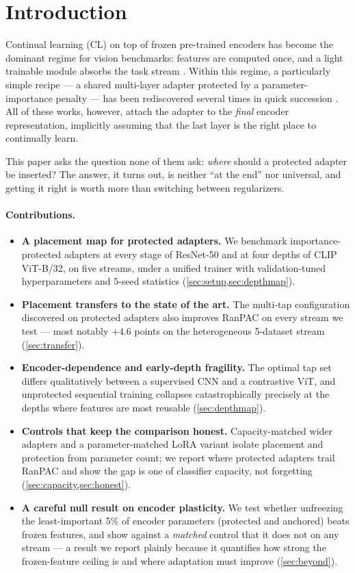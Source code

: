\documentclass{article} %
\begin{document}
\section{Introduction}
Continual learning (CL) on top of frozen pre-trained encoders has become the
dominant regime for vision benchmarks: features are computed once, and a light
trainable module absorbs the task stream
\citep{zhou2023revisiting,mcdonnell2023ranpac,wang2022l2p}. Within this regime,
a particularly simple recipe --- a shared multi-layer adapter protected by a
parameter-importance penalty \citep{kirkpatrick2017ewc,aljundi2018mas} --- has
been rediscovered several times in quick succession
\citep{ewclora2026,onlinelora2025}. All of these works, however,
attach the adapter to the \emph{final} encoder representation, implicitly
assuming that the last layer is the right place to continually learn.

This paper asks the question none of them ask: \emph{where} should a protected
adapter be inserted? The answer, it turns out, is neither ``at the end'' nor
universal, and getting it right is worth more than switching between
regularizers.

\paragraph{Contributions.}
\begin{itemize}
\item \textbf{A placement map for protected adapters.} We benchmark
  importance-protected adapters at every stage of ResNet-50 and at four depths
  of CLIP ViT-B/32, on five streams, under a unified trainer with
  validation-tuned hyperparameters and 5-seed statistics
  (\cref{sec:setup,sec:depthmap}).
\item \textbf{Placement transfers to the state of the art.} The multi-tap
  configuration discovered on protected adapters also improves RanPAC
  \citep{mcdonnell2023ranpac} on every stream we test --- most notably
  $+4.6$ points on the heterogeneous 5-dataset stream (\cref{sec:transfer}).
\item \textbf{Encoder-dependence and early-depth fragility.} The optimal tap
  set differs qualitatively between a supervised CNN and a contrastive ViT,
  and unprotected sequential training collapses catastrophically precisely at
  the depths where features are most reusable (\cref{sec:depthmap}).
\item \textbf{Controls that keep the comparison honest.} Capacity-matched
  wider adapters and a parameter-matched LoRA variant isolate placement and
  protection from parameter count; we report where protected adapters trail
  RanPAC and show the gap is one of classifier capacity, not forgetting
  (\cref{sec:capacity,sec:honest}).
\item \textbf{A careful null result on encoder plasticity.} We test whether
  unfreezing the least-important 5\% of encoder parameters (protected and
  anchored) beats frozen features, and show against a \emph{matched} control
  that it does not on any stream --- a result we report plainly because it
  quantifies how strong the frozen-feature ceiling is and where adaptation
  must improve (\cref{sec:beyond}).
\end{itemize}
\end{document}
